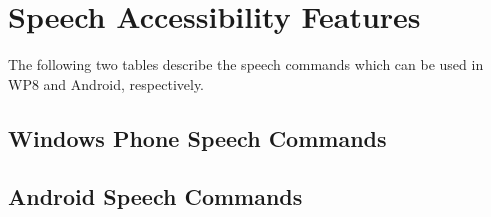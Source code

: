 \chapter{Speech Accessibility Features}
The following two tables describe the speech commands which can be used in WP8 and Android, respectively.
\section{Windows Phone Speech Commands}

\pagebreak
\section{Android Speech Commands}
